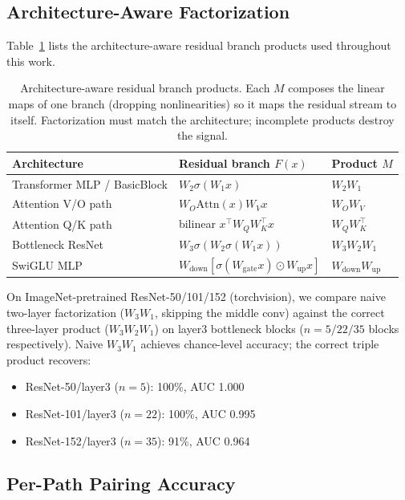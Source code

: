 \subsection{Architecture-Aware Factorization}\label{app:factorization}

Table~\ref{tab:factorization} lists the architecture-aware residual branch products used throughout this work.

\begin{table}[t]
\centering
\small
\begin{tabular}{@{}lll@{}}
\toprule
Architecture & Residual branch $F(x)$ & Product $M$ \\
\midrule
Transformer MLP / BasicBlock & $W_2 \sigma(W_1 x)$ & $W_2 W_1$ \\
Attention V/O path & $W_O \mathrm{Attn}(x) W_V x$ & $W_O W_V$ \\
Attention Q/K path & bilinear $x^\top W_Q W_K^\top x$ & $W_Q W_K^\top$ \\
Bottleneck ResNet & $W_3 \sigma(W_2 \sigma(W_1 x))$ & $W_3 W_2 W_1$ \\
SwiGLU MLP & $W_{\mathrm{down}} [\sigma(W_{\mathrm{gate}} x) \odot W_{\mathrm{up}} x]$ & $W_{\mathrm{down}} W_{\mathrm{up}}$ \\
\bottomrule
\end{tabular}
\caption{Architecture-aware residual branch products. Each $M$ composes the linear maps of one branch (dropping nonlinearities) so it maps the residual stream to itself. Factorization must match the architecture; incomplete products destroy the signal.}
\label{tab:factorization}
\end{table}

On ImageNet-pretrained ResNet-50/101/152 (torchvision), we compare naive two-layer factorization ($W_3 W_1$, skipping the middle conv) against the correct three-layer product ($W_3 W_2 W_1$) on layer3 bottleneck blocks ($n{=}5/22/35$ blocks respectively). Naive $W_3 W_1$ achieves chance-level accuracy; the correct triple product recovers:
\begin{itemize}[nosep]
\item ResNet-50/layer3 ($n{=}5$): 100\%, AUC 1.000
\item ResNet-101/layer3 ($n{=}22$): 100\%, AUC 0.995
\item ResNet-152/layer3 ($n{=}35$): 91\%, AUC 0.964
\end{itemize}

\subsection{Per-Path Pairing Accuracy}\label{app:path-breakdown}

